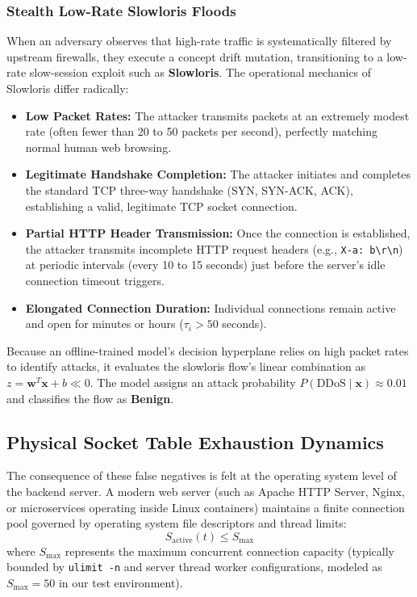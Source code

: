 \documentclass[12pt,a4paper,oneside]{report}
\begin{document}
\subsubsection{Stealth Low-Rate Slowloris Floods}
When an adversary observes that high-rate traffic is systematically filtered by upstream firewalls, they execute a concept drift mutation, transitioning to a low-rate slow-session exploit such as \textbf{Slowloris}. The operational mechanics of Slowloris differ radically:
\begin{itemize}
    \item \textbf{Low Packet Rates:} The attacker transmits packets at an extremely modest rate (often fewer than 20 to 50 packets per second), perfectly matching normal human web browsing.
    \item \textbf{Legitimate Handshake Completion:} The attacker initiates and completes the standard TCP three-way handshake (SYN, SYN-ACK, ACK), establishing a valid, legitimate TCP socket connection.
    \item \textbf{Partial HTTP Header Transmission:} Once the connection is established, the attacker transmits incomplete HTTP request headers (e.g., \texttt{X-a: b\textbackslash r\textbackslash n}) at periodic intervals (every 10 to 15 seconds) just before the server's idle connection timeout triggers.
    \item \textbf{Elongated Connection Duration:} Individual connections remain active and open for minutes or hours ($\tau_i > 50$ seconds).
\end{itemize}

Because an offline-trained model's decision hyperplane relies on high packet rates to identify attacks, it evaluates the slowloris flow's linear combination as $z = \mathbf{w}^T \mathbf{x} + b \ll 0$. The model assigns an attack probability $P(\text{DDoS} \mid \mathbf{x}) \approx 0.01$ and classifies the flow as \textbf{Benign}.

\subsection{Physical Socket Table Exhaustion Dynamics}
The consequence of these false negatives is felt at the operating system level of the backend server. A modern web server (such as Apache HTTP Server, Nginx, or microservices operating inside Linux containers) maintains a finite connection pool governed by operating system file descriptors and thread limits:
\begin{equation}
S_{\text{active}}(t) \le S_{\max}
\end{equation}
where $S_{\max}$ represents the maximum concurrent connection capacity (typically bounded by \texttt{ulimit -n} and server thread worker configurations, modeled as $S_{\max} = 50$ in our test environment).
\end{document}
